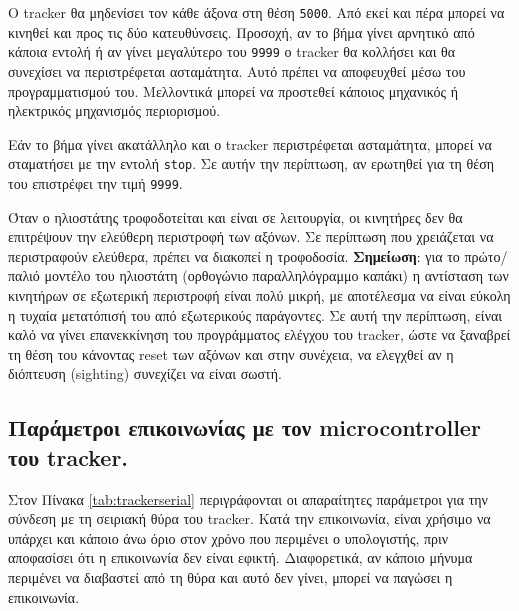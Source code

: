 \documentclass[
  a4paper,
  twoside,
  titlepage,
  11pt]{article}
\numberwithin{equation}{section}
\numberwithin{figure}{section}
\numberwithin{table}{section}
\begin{document}
Ο tracker θα μηδενίσει τον κάθε άξονα στη θέση \texttt{\textquotesingle{}5000\textquotesingle{}}. Από εκεί και πέρα μπορεί να
κινηθεί και προς τις δύο κατευθύνσεις. Προσοχή, αν το βήμα γίνει αρνητικό από κάποια
εντολή ή αν γίνει μεγαλύτερο του \texttt{\textquotesingle{}9999\textquotesingle{}} ο tracker θα κολλήσει και θα συνεχίσει να
περιστρέφεται ασταμάτητα. Αυτό πρέπει να αποφευχθεί μέσω του προγραμματισμού του.
Μελλοντικά μπορεί να προστεθεί κάποιος μηχανικός ή ηλεκτρικός μηχανισμός περιορισμού.

Εάν το βήμα γίνει ακατάλληλο και ο tracker περιστρέφεται ασταμάτητα, μπορεί να
σταματήσει με την εντολή \texttt{\textquotesingle{}stop\textquotesingle{}}. Σε αυτήν την περίπτωση, αν ερωτηθεί για τη θέση
του επιστρέφει την τιμή \texttt{\textquotesingle{}9999\textquotesingle{}}.

Όταν ο ηλιοστάτης τροφοδοτείται και είναι σε λειτουργία, οι κινητήρες δεν θα
επιτρέψουν την ελεύθερη περιστροφή των αξόνων. Σε περίπτωση που χρειάζεται να
περιστραφούν ελεύθερα, πρέπει να διακοπεί η τροφοδοσία. \textbf{Σημείωση}: για το
πρώτο/παλιό μοντέλο του ηλιοστάτη (ορθογώνιο παραλληλόγραμμο καπάκι) η αντίσταση των
κινητήρων σε εξωτερική περιστροφή είναι πολύ μικρή, με αποτέλεσμα να είναι εύκολη η
τυχαία μετατόπισή του από εξωτερικούς παράγοντες. Σε αυτή την περίπτωση, είναι καλό
να γίνει επανεκκίνηση του προγράμματος ελέγχου του tracker, ώστε να ξαναβρεί τη θέση
του κάνοντας reset των αξόνων και στην συνέχεια, να ελεγχθεί αν η διόπτευση
(sighting) συνεχίζει να είναι σωστή.

\hypertarget{ux3c0ux3b1ux3c1ux3acux3bcux3b5ux3c4ux3c1ux3bfux3b9-ux3b5ux3c0ux3b9ux3baux3bfux3b9ux3bdux3c9ux3bdux3afux3b1ux3c2-ux3bcux3b5-ux3c4ux3bfux3bd-microcontroller-ux3c4ux3bfux3c5-tracker.}{%
\subsection{Παράμετροι επικοινωνίας με τον microcontroller του tracker.}\label{ux3c0ux3b1ux3c1ux3acux3bcux3b5ux3c4ux3c1ux3bfux3b9-ux3b5ux3c0ux3b9ux3baux3bfux3b9ux3bdux3c9ux3bdux3afux3b1ux3c2-ux3bcux3b5-ux3c4ux3bfux3bd-microcontroller-ux3c4ux3bfux3c5-tracker.}}

Στον Πίνακα \ref{tab:trackerserial} περιγράφονται οι απαραίτητες παράμετροι για την
σύνδεση με τη σειριακή θύρα του tracker. Κατά την επικοινωνία, είναι χρήσιμο να
υπάρχει και κάποιο άνω όριο στον χρόνο που περιμένει ο υπολογιστής, πριν αποφασίσει
ότι η επικοινωνία δεν είναι εφικτή. Διαφορετικά, αν κάποιο μήνυμα περιμένει να
διαβαστεί από τη θύρα και αυτό δεν γίνει, μπορεί να παγώσει η επικοινωνία.
\end{document}
